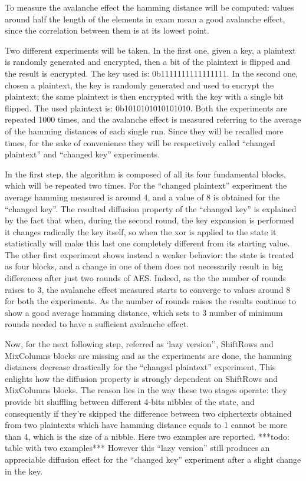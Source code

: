 \documentclass[12pt]{article}
\begin{document}
To measure the avalanche effect the hamming distance will be computed: values around half the length of the elements in exam mean a good avalanche effect, since the correlation between them is at its lowest point.

Two different experiments will be taken.
In the first one, given a key, a plaintext is randomly generated and encrypted, then a bit of the plaintext is flipped and the result is encrypted. The key used is: {\color{blue}0b1111111111111111}.
In the second one, chosen a plaintext, the key is randomly generated and used to encrypt the plaintext; the same plaintext is then encrypted with the key with a single bit flipped. The used plaintext is: {\color{blue}0b1010101010101010}.
Both the experiments are repeated 1000 times, and the avalanche effect is measured referring to the average of the hamming distances of each single run.
Since they will be recalled more times, for the sake of convenience they will be respectively called ``changed plaintext'' and ``changed key'' experiments.

In the first step, the algorithm is composed of all its four fundamental blocks, which will be repeated two times. For the ``changed plaintext'' experiment the average hamming measured is around {\color{blue}4}, and a value of {\color{blue}8} is obtained for the ``changed key''.
The resulted diffusion property of the ``changed key'' is explained by the fact that when, during the second round, the key expansion is performed it changes radically the key itself, so when the xor is applied to the state it statistically will make this last one completely different from its starting value.
The other first experiment shows instead a weaker behavior: the state is treated as four blocks, and a change in one of them does not necessarily result in big differences after just two rounds of AES\@. Indeed, as the the number of rounds raises to 3, the avalanche effect measured starts to converge to values around {\color{blue}8} for both the experiments.
As the number of rounds raises the results continue to show a good average hamming distance, which sets to 3 number of minimum rounds needed to have a sufficient avalanche effect.

Now, for the next following step, referred as `lazy version'', ShiftRows and MixColumns blocks are missing and as the experiments are done, the hamming distances decrease drastically for the ``changed plaintext'' experiment. This enlights how the diffusion property is strongly dependent on ShiftRows and MixColumns blocks. The reason lies in the way these two stages operate: they provide bit shuffling between different 4-bits nibbles of the state, and consequently if they're skipped the difference between two ciphertexts obtained from two plaintexts which have hamming distance equals to {\color{blue}1} cannot be more than 4, which is the size of a nibble.
Here two examples are reported.
***todo: table with two examples***
However this ``lazy version'' still produces an appreciable diffusion effect for the ``changed key'' experiment after a slight change in the key.
\end{document}
